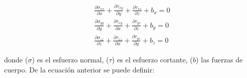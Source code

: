 \begin{ceqn} 
\begin{subequations} \label{eq:equ31} 
\begin{gather}
\frac{\partial\sigma_{xx}}{\partial x} + \frac{\partial\tau_{xy}}{\partial y} + \frac{\partial\tau_{xz}}{\partial z} + b_x = 0 \label{eq:equ31a} \\[5pt]
\frac{\partial\sigma_{yy}}{\partial y} + \frac{\partial\tau_{xy}}{\partial x} + \frac{\partial\tau_{yz}}{\partial z} + b_y = 0 \label{eq:equ31b}\\[5pt]
\frac{\partial\sigma_{zz}}{\partial z} + \frac{\partial\tau_{xz}}{\partial x} + \frac{\partial\tau_{yz}}{\partial y}+ b_z = 0 \label{eq:equ31c}
\end{gather}  
\end{subequations} 
\end{ceqn}
donde ($\sigma$) es el esfuerzo normal, ($\tau$) es el esfuerzo cortante, ($b$) las fuerzas de cuerpo. De la ecuación anterior se puede definir:
